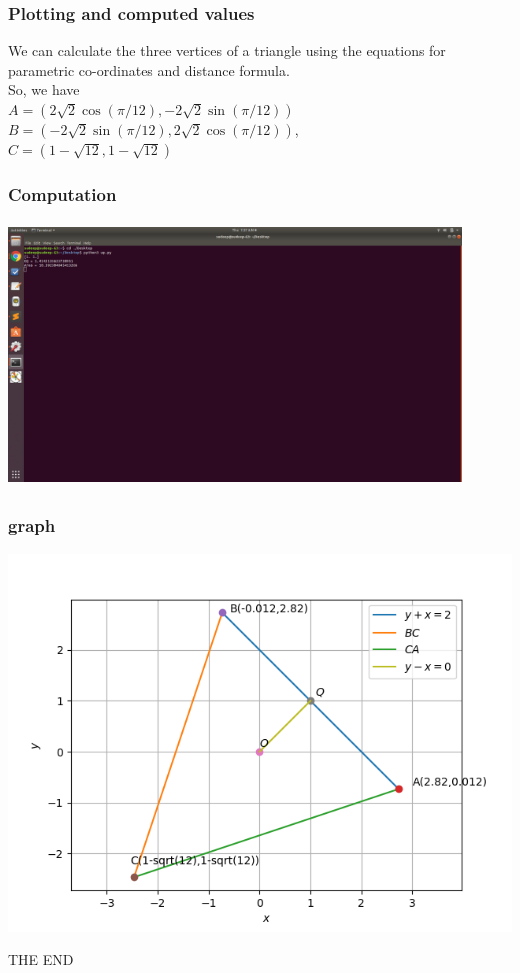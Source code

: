 \documentclass{beamer}
\begin{document}

\begin{frame}
\frametitle{Plotting and computed values}
We can calculate the three vertices of a triangle using the equations \linebreak for parametric co-ordinates and distance formula.\\
So, we have \\
\quad\quad\quad\quad\quad\quad\quad$ A=(2\sqrt{2}\cos(\pi/12) , -2\sqrt{2}\sin(\pi/12) ) $ \\
\quad\quad\quad\quad\quad\quad\quad $B = (-2\sqrt{2}\sin(\pi/12) , 2\sqrt{2}\cos(\pi/12) )$,\\
\quad\quad\quad\quad\quad\quad\quad $C =(1- \sqrt{12}  , 1- \sqrt{12}) $
\end{frame}


\begin{frame}
\frametitle{Computation} 
\includegraphics[height = 7cm , width =12cm]{computation}
\end{frame}


\begin{frame}
\frametitle{graph}
\includegraphics[scale = .6]{uj1}
\end{frame}


\begin{frame}
\quad\quad\quad  \quad\quad\quad\quad\quad\quad \quad\quad\quad \quad\quad  THE END
\end{frame}
\end{document}
